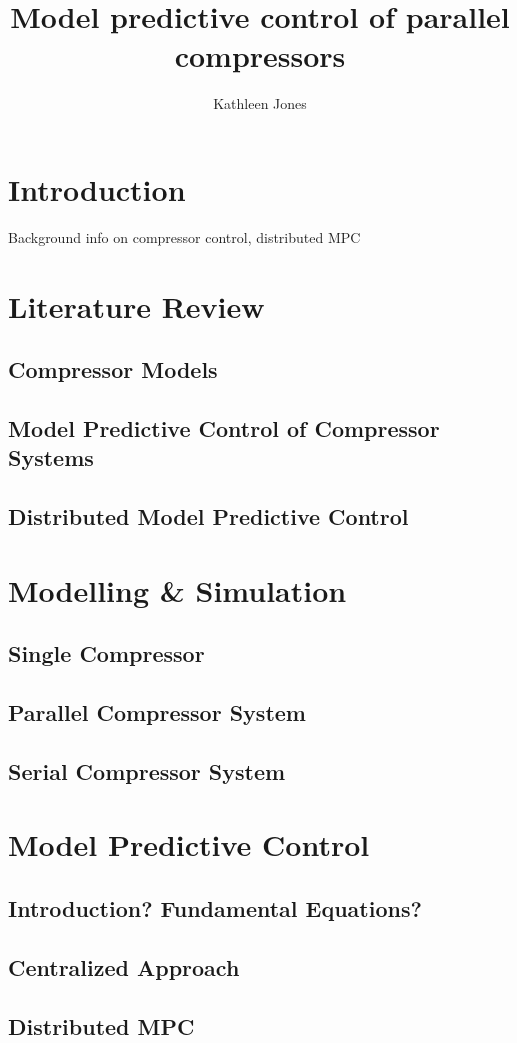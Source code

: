 \documentclass[doubleheaders,titlepage,oneside,openright,12pt]{epflthesis}
\author{Kathleen Jones}
\title{Model predictive control of parallel compressors}
\numberwithin{equation}{chapter}
\begin{document}
\chapter{Introduction}
Background info on compressor control, distributed MPC

\chapter{Literature Review}
\section{Compressor Models}
\section{Model Predictive Control of Compressor Systems}
\section{Distributed Model Predictive Control}

\chapter{Modelling \& Simulation}
\section{Single Compressor}
\section{Parallel Compressor System}
\section{Serial Compressor System}

\chapter{Model Predictive Control}
\section{Introduction? Fundamental Equations?}
\section{Centralized Approach}
\section{Distributed MPC}
\end{document}
